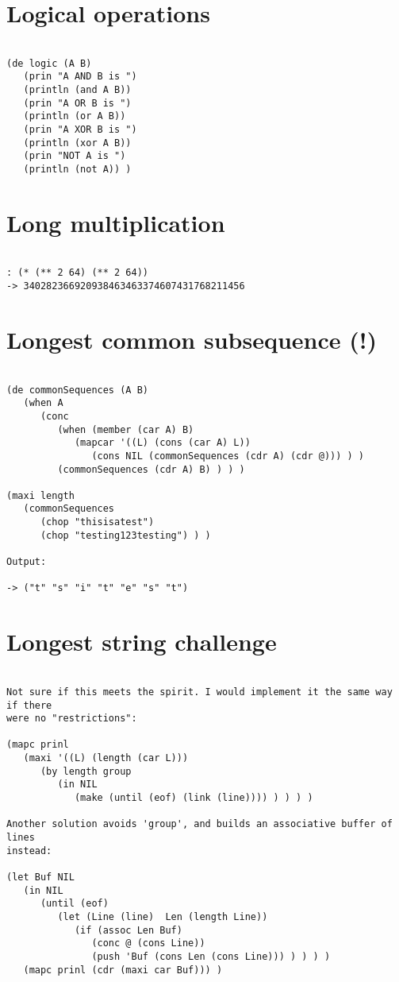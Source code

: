 \section*{Logical operations}

\begin{verbatim}

(de logic (A B)
   (prin "A AND B is ")
   (println (and A B))
   (prin "A OR B is ")
   (println (or A B))
   (prin "A XOR B is ")
   (println (xor A B))
   (prin "NOT A is ")
   (println (not A)) )

\end{verbatim}

\section*{Long multiplication}

\begin{verbatim}

: (* (** 2 64) (** 2 64))
-> 340282366920938463463374607431768211456

\end{verbatim}

\section*{Longest common subsequence (!)}

\begin{verbatim}

(de commonSequences (A B)
   (when A
      (conc
         (when (member (car A) B)
            (mapcar '((L) (cons (car A) L))
               (cons NIL (commonSequences (cdr A) (cdr @))) ) )
         (commonSequences (cdr A) B) ) ) )

(maxi length
   (commonSequences
      (chop "thisisatest")
      (chop "testing123testing") ) )

Output:

-> ("t" "s" "i" "t" "e" "s" "t")

\end{verbatim}

\section*{Longest string challenge}

\begin{verbatim}

Not sure if this meets the spirit. I would implement it the same way if there
were no "restrictions":

(mapc prinl
   (maxi '((L) (length (car L)))
      (by length group
         (in NIL
            (make (until (eof) (link (line)))) ) ) ) )

Another solution avoids 'group', and builds an associative buffer of lines
instead:

(let Buf NIL
   (in NIL
      (until (eof)
         (let (Line (line)  Len (length Line))
            (if (assoc Len Buf)
               (conc @ (cons Line))
               (push 'Buf (cons Len (cons Line))) ) ) ) )
   (mapc prinl (cdr (maxi car Buf))) )

\end{verbatim}

